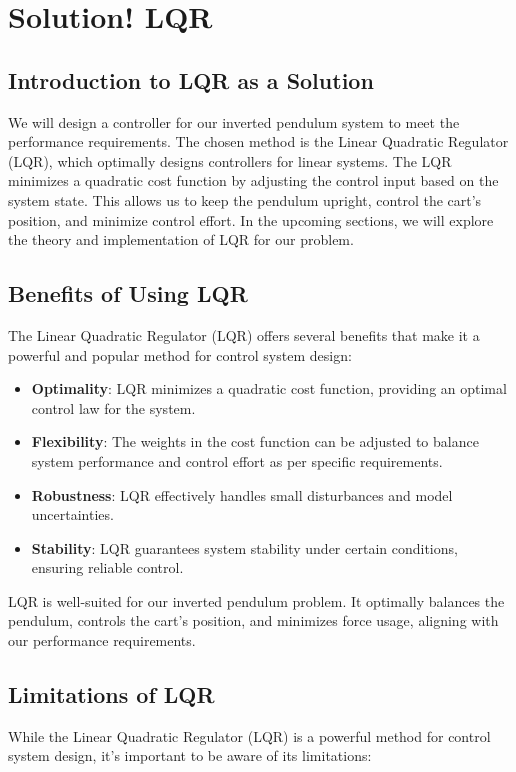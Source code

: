 \documentclass[11pt,twocolumn,twoside,lineno]{pnas-new}
\begin{document}
\section{Solution! LQR}
\subsection{Introduction to LQR as a Solution}
We will design a controller for our inverted pendulum system to meet the performance requirements. The chosen method is the Linear Quadratic Regulator (LQR), which optimally designs controllers for linear systems. The LQR minimizes a quadratic cost function by adjusting the control input based on the system state. This allows us to keep the pendulum upright, control the cart's position, and minimize control effort. In the upcoming sections, we will explore the theory and implementation of LQR for our problem.

\subsection{Benefits of Using LQR}
The Linear Quadratic Regulator (LQR) offers several benefits that make it a powerful and popular method for control system design:

\begin{itemize}
    \item \textbf{Optimality}: LQR minimizes a quadratic cost function, providing an optimal control law for the system.
    \item \textbf{Flexibility}: The weights in the cost function can be adjusted to balance system performance and control effort as per specific requirements.
    \item \textbf{Robustness}: LQR effectively handles small disturbances and model uncertainties.
    \item \textbf{Stability}: LQR guarantees system stability under certain conditions, ensuring reliable control.
\end{itemize}

LQR is well-suited for our inverted pendulum problem. It optimally balances the pendulum, controls the cart's position, and minimizes force usage, aligning with our performance requirements.

\subsection{Limitations of LQR}
While the Linear Quadratic Regulator (LQR) is a powerful method for control system design, it's important to be aware of its limitations:
\end{document}
